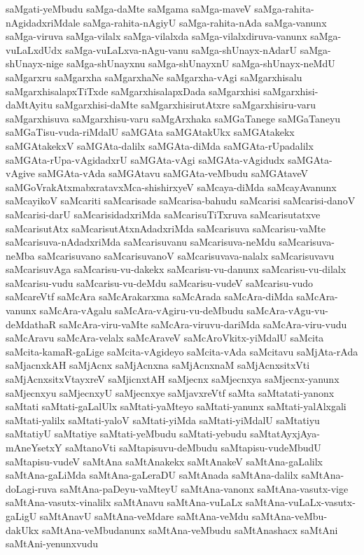 {saMgati-yeMbudu
saMga-daMte
saMgama
saMga-maveV
saMga-rahita-nAgidadxriMdale
saMga-rahita-nAgiyU
saMga-rahita-nAda
saMga-vanunx
saMga-viruva
saMga-vilalx
saMga-vilalxda
saMga-vilalxdiruva-vanunx
saMga-vuLaLxdUdx
saMga-vuLaLxva-nAgu-vanu
saMga-shUnayx-nAdarU
saMga-shUnayx-nige
saMga-shUnayxnu
saMga-shUnayxnU
saMga-shUnayx-neMdU
saMgarxru
saMgarxha
saMgarxhaNe
saMgarxha-vAgi
saMgarxhisalu
saMgarxhisalapxTiTxde
saMgarxhisalapxDada
saMgarxhisi
saMgarxhisi-daMtAyitu
saMgarxhisi-daMte
saMgarxhisirutAtxre
saMgarxhisiru-varu
saMgarxhisuva
saMgarxhisu-varu
saMgArxhaka
saMGaTanege
saMGaTaneyu
saMGaTisu-vuda-riMdalU
saMGAta
saMGAtakUkx
saMGAtakekx
saMGAtakekxV
saMGAta-dalilx
saMGAta-diMda
saMGAta-rUpadalilx
saMGAta-rUpa-vAgidadxrU
saMGAta-vAgi
saMGAta-vAgidudx
saMGAta-vAgive
saMGAta-vAda
saMGAtavu
saMGAta-veMbudu
saMGAtaveV
saMGoVrakAtxmabxratavxMca-shishirxyeV
saMcaya-diMda
saMcayAvanunx
saMcayikoV
saMcariti
saMcarisade
saMcarisa-bahudu
saMcarisi
saMcarisi-danoV
saMcarisi-darU
saMcarisidadxriMda
saMcarisuTiTxruva
saMcarisutatxve
saMcarisutAtx
saMcarisutAtxnAdadxriMda
saMcarisuva
saMcarisu-vaMte
saMcarisuva-nAdadxriMda
saMcarisuvanu
saMcarisuva-neMdu
saMcarisuva-neMba
saMcarisuvano
saMcarisuvanoV
saMcarisuvava-nalalx
saMcarisuvavu
saMcarisuvAga
saMcarisu-vu-dakekx
saMcarisu-vu-danunx
saMcarisu-vu-dilalx
saMcarisu-vudu
saMcarisu-vu-deMdu
saMcarisu-vudeV
saMcarisu-vudo
saMcareVtf
saMcAra
saMcArakarxma
saMcArada
saMcAra-diMda
saMcAra-vanunx
saMcAra-vAgalu
saMcAra-vAgiru-vu-deMbudu
saMcAra-vAgu-vu-deMdathaR
saMcAra-viru-vaMte
saMcAra-viruvu-dariMda
saMcAra-viru-vudu
saMcAravu
saMcAra-velalx
saMcAraveV
saMcAroVkitx-yiMdalU
saMcita
saMcita-kamaR-gaLige
saMcita-vAgideyo
saMcita-vAda
saMcitavu
saMjAta-rAda
saMjacnxkAH
saMjAcnx
saMjAcnxna
saMjAcnxnaM
saMjAcnxsitxVti
saMjAcnxsitxVtayxreV
saMjicnxtAH
saMjecnx
saMjecnxya
saMjecnx-yanunx
saMjecnxyu
saMjecnxyU
saMjecnxye
saMjavxreVtf
saMta
saMtatati-yanonx
saMtati
saMtati-gaLalUlx
saMtati-yaMteyo
saMtati-yanunx
saMtati-yalAlxgali
saMtati-yalilx
saMtati-yaloV
saMtati-yiMda
saMtati-yiMdalU
saMtatiyu
saMtatiyU
saMtatiye
saMtati-yeMbudu
saMtati-yebudu
saMtatAyxjAya-mAneYsetxY
saMtanoVti
saMtapisuvu-deMbudu
saMtapisu-vudeMbudU
saMtapisu-vudeV
saMtAna
saMtAnakekx
saMtAnakeV
saMtAna-gaLalilx
saMtAna-gaLiMda
saMtAna-gaLeraDU
saMtAnada
saMtAna-dalilx
saMtAna-doLagi-ruva
saMtAna-paDeyu-vaMteyU
saMtAna-vanonx
saMtAna-vasutx-vige
saMtAna-vasutx-vinalilx
saMtAnavu
saMtAna-vuLaLx
saMtAna-vuLaLx-vasutx-gaLigU
saMtAnavU
saMtAna-veMdare
saMtAna-veMdu
saMtAna-veMbu-dakUkx
saMtAna-veMbudanunx
saMtAna-veMbudu
saMtAnashacx
saMtAni
saMtAni-yenunxvudu
}
